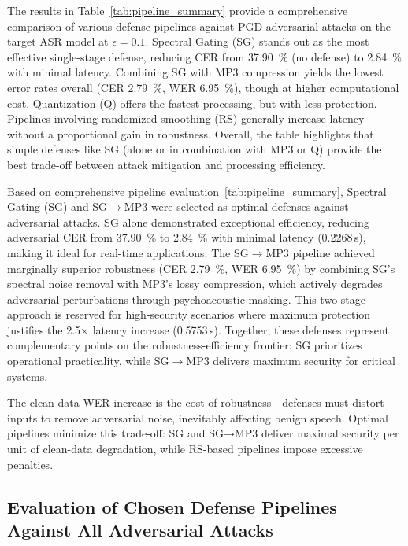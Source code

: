 \documentclass[../main.tex]{subfiles}
\begin{document}
The results in Table~\ref{tab:pipeline_summary} provide a comprehensive comparison of various defense pipelines against PGD adversarial attacks on the target ASR model at \(\epsilon = 0.1\). Spectral Gating (SG) stands out as the most effective single-stage defense, reducing CER from \SI{37.90}{\percent} (no defense) to \SI{2.84}{\percent} with minimal latency. Combining SG with MP3 compression yields the lowest error rates overall (CER \SI{2.79}{\percent}, WER \SI{6.95}{\percent}), though at higher computational cost. Quantization (Q) offers the fastest processing, but with less protection. Pipelines involving randomized smoothing (RS) generally increase latency without a proportional gain in robustness. Overall, the table highlights that simple defenses like SG (alone or in combination with MP3 or Q) provide the best trade-off between attack mitigation and processing efficiency.


Based on comprehensive pipeline evaluation~\ref{tab:pipeline_summary}, Spectral Gating (SG) and SG\(\to\)MP3 were selected as optimal defenses against adversarial attacks. SG alone demonstrated exceptional efficiency, reducing adversarial CER from \SI{37.90}{\percent} to \SI{2.84}{\percent} with minimal latency (\num{0.2268}\,s), making it ideal for real-time applications. The SG\(\to\)MP3 pipeline achieved marginally superior robustness (CER \SI{2.79}{\percent}, WER \SI{6.95}{\percent}) by combining SG's spectral noise removal with MP3's lossy compression, which actively degrades adversarial perturbations through psychoacoustic masking. This two-stage approach is reserved for high-security scenarios where maximum protection justifies the \num{2.5}\(\times\) latency increase (\num{0.5753}\,s). Together, these defenses represent complementary points on the robustness-efficiency frontier: SG prioritizes operational practicality, while SG\(\to\)MP3 delivers maximum security for critical systems.

The clean-data WER increase is the cost of robustness—defenses must distort inputs to remove adversarial noise, inevitably affecting benign speech. Optimal pipelines minimize this trade-off: SG and SG→MP3 deliver maximal security per unit of clean-data degradation, while RS-based pipelines impose excessive penalties.




\subsection{Evaluation of Chosen Defense Pipelines Against All Adversarial Attacks}
\label{subsec:results}
\end{document}
